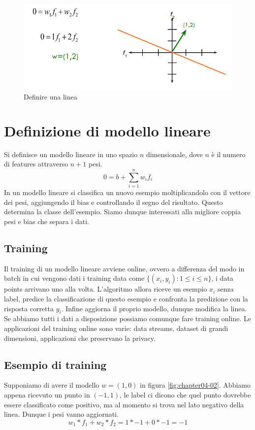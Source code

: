 	\begin{figure}
		\centering
		\includegraphics[width=0.6\linewidth]{imgs/chapter4/img0}
		\caption{Definire una linea}
		\label{fig:chapter04-00}
	\end{figure}

\section{Definizione di modello lineare}
Si definisce un modello lineare in uno spazio $n$ dimensionale, dove $n$ \`e il numero di features attraverso $n+1$ pesi.
$$0=b+\sum\limits_{i=1}^nw_if_i$$
In un modello lineare si classifica un nuovo esempio moltiplicandolo con il vettore dei pesi, aggiungendo il bias e controllando il segno del risultato.
Questo determina la classe dell'esempio. 
Siamo dunque interessati alla migliore coppia pesi e bias che separa i dati.

	\subsection{Training}
	Il training di un modello lineare avviene online, ovvero a differenza del modo in batch in cui vengono dati i training data come $\{(x_i, y_i):1\le i\le n\}$, i data points arrivano uno alla volta.
	L'algoritmo allora riceve un esempio $x_i$ senza label, predice la classificazione di questo esempio e confronta la predizione con la risposta corretta $y_i$.
	Infine aggiorna il proprio modello, dunque modifica la linea. 
	Se abbiamo tutti i dati a disposizione possiamo comunque fare training online.
	Le applicazioni del training online sono varie: data streams, dataset di grandi dimensioni, applicazioni che preservano la privacy.
	\subsection{Esempio di training}
	Supponiamo di avere il modello $w=(1,0)$ in figura \ref{fig:chapter04-02}. 
	Abbiamo appena ricevuto un punto in $(-1,1)$, le label ci dicono che quel punto dovrebbe essere classificato come positivo, ma al momento si trova nel lato negativo della linea. 
	Dunque i pesi vanno aggiornati.
	$$w_1*f_1 + w_2 * f_2 = 1 * -1 + 0 * -1 = -1$$
	
